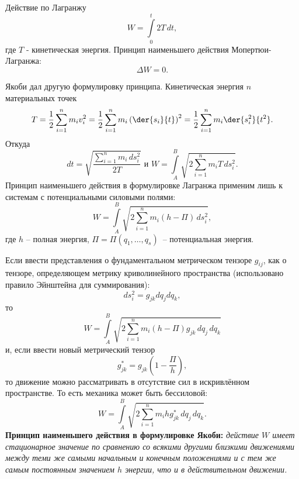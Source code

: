 
Действие по Лагранжу
\[
    W = \int\limits_{0}^t 2T\,dt,
\]
где \( T \) - кинетическая энергия. Принцип наименьшего действия
Мопертюи-Лагранжа:
\[
    \Delta W = 0.
\]

Якоби дал другую формулировку принципа. Кинетическая энергия \( n \)
материальных точек
\[
    T = \frac{1}{2}\sum\limits_{i=1}^{n} m_i v_i^2 = 
    \frac{1}{2}\sum\limits_{i=1}^{n} m_i \left(\der{s_i}{t}\right)^2 = 
    \frac{1}{2}\sum\limits_{i=1}^{n} m_i \der{s_i^2}{t^2}.
\]
Откуда 
\[
    dt = \sqrt{\frac{\sum\limits_{i=1}^{n} m_i\,ds_i^2}{2T}} \text{ и }
    W = \int\limits_{A}^B \sqrt{{2\sum\limits_{i=1}^{n} m_i T\,ds_i^2}}.
\]
Принцип наименьшего действия в формулировке Лагранжа применим лишь к системам
с потенциальными силовыми полями:
\[
    W = \int\limits_{A}^B \sqrt{{2\sum\limits_{i=1}^{n} m_i {(h-\Pi)}\,ds_i^2}},
\]
где \( h \) -- полная энергия, \( \Pi = \Pi(q_1, \dots, q_s) \)~--
потенциальная энергия.

Если ввести представления о фундаментальном метрическом тензоре \( g_{ij} \),
как о тензоре, определяющем метрику криволинейного пространства 
(использовано правило Эйнштейна для суммирования):
\[
    ds_i^2 = g_{jk}dq_jdq_k,
\]
то 
\[
    W = \int\limits_{A}^B
    \sqrt{{2\sum\limits_{i=1}^{n} m_i (h-\Pi) g_{jk}\,dq_j\,dq_k}}
\]
и, если ввести новый метрический тензор
\[
    g_{jk}^* = g_{jk}\left(1-\frac{\Pi}{h}\right),
\]
то движение можно рассматривать в отсутствие сил в искривлённом пространстве.
То есть механика может быть бессиловой:
\[
    W = \int\limits_{A}^B
    \sqrt{{2\sum\limits_{i=1}^{n} m_i h g_{jk}^*\,dq_j\,dq_k}}.
\] 
\textbf{Принцип наименьшего действия в формулировке Якоби:}
\emph{действие \( W \) имеет стационарное значение по сравнению со всякими
другими близкими движениями между теми же самыми начальным и
конечным положениями и с тем же самым постоянным значением \( h \) энергии,
что и в действительном движении.}
\newpage
